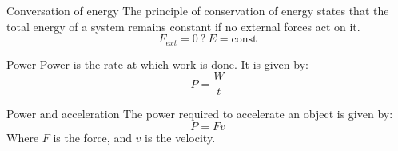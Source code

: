 \begin{theorem}
    {Conversation of energy}
    The principle of conservation of energy states that the total energy of a system remains constant if no external forces act on it.
    \[F_{ext}=0\ ?\ E=\text{const}\]
\end{theorem}

\begin{definition}
    {Power}
    Power is the rate at which work is done. It is given by:
    \[P=\frac{W}{t}\]
\end{definition}

\begin{theorem}
    {Power and acceleration}
    The power required to accelerate an object is given by:
    \[P=Fv\]
    Where $F$ is the force, and $v$ is the velocity.
\end{theorem}